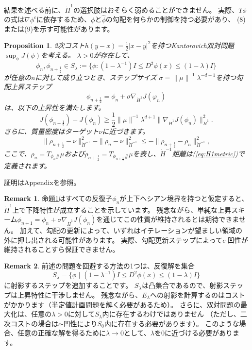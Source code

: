 \documentclass{jsarticle}
\newtheorem{prop}[thm]{Proposition}
\theoremstyle{definition}
\newtheorem{rem}{Remark}[section]
\begin{document}
結果を述べる前に、$\dot{H}^1$の選択肢はおそらく弱めることができません。
実際、$T\phi$の式は$\nabla\phi^c$に依存するため、$\phi$と$\hat{\phi}$の勾配を何らかの制御を持つ必要があり、
(8)または(9)を示す可能性があります。\\


\begin{prop}
  \label{prop:勾配上昇保持}
  2次コスト$h(y-x)=\frac{1}{2}|x-y|^2$を持つKantorovich双対問題$\sup_{\phi}J(\phi)$を考える。
  $\lambda>0$が存在して、
  $$
  \phi_n, \phi_{n + \frac{1}{2}} \in S_{\lambda}:=\{\phi:(1-\lambda^{-1})I \leq D^2\phi(x) \leq (1-\lambda)I\}
  $$
  が任意の$n$に対して成り立つとき、ステップサイズ
  $\sigma = \|\mu\|^{-1}\lambda^{-d+1}$を持つ勾配上昇ステップ
  $$
  \phi_{n+\frac{1}{2}} = \phi_n + \sigma \nabla_{\dot{H}^1} J(\varphi_n)
  $$
  は、以下の上昇性を満たします。
  $$
  J(\phi_{n + \frac{1}{2}})-J(\phi_n) \geq \frac{1}{2}{\|\mu\|^{-1}\lambda^{d+1}}\|\nabla_{\dot{H}^1} J(\phi_n)\|_{\dot{H}^1}^2.
  $$
  さらに、質量密度はターゲット$\nu$に近づきます。
  $$
  \|\rho_{n + \frac{1}{2}} - \nu\|_{\dot{H}^{-1}}^2 - \|\rho_n - \nu\|_{\dot{H}^{-1}}^2 \leq -\|\rho_{n + \frac{1}{2}} - \rho_n\|_{\dot{H}^{-1}}^2,
  $$
  ここで、$\rho_n = T_{\phi_n \#}\mu$および$\rho_{n+\frac{1}{2}} = T_{\phi_{n+\frac{1}{2}} \#}\mu$を表し、$\dot{H}^{-1}$距離は(\ref{eq:H1metric})で定義されます。

\end{prop}


証明はAppendixを参照。

\begin{rem}
  命題\ref{prop:勾配上昇保持}はすべての反復子$\phi_n$が上下ヘシアン境界を持つと仮定すると、$\dot{H}^1$上で下降特性が成立することを示しています。
  残念ながら、単純な上昇スキーム$\phi_{n+1} = \phi_n + \sigma \nabla_{\dot{H}^1} J (\phi_n)$を通じてこの性質が維持されるとは期待できません。
  加えて、勾配の更新によって、いずれはイテレーションが望ましい領域の外に押し出される可能性があります。
  実際、勾配更新ステップによって$c$-凹性が維持されることすら保証できません。
\end{rem}


\begin{rem}
  前述の問題を回避する方法の1つは、反復解を集合
  $$
  S_{\lambda} = \{\phi \,\, | \,\, (1-\lambda^{-1})I \leq D^2\phi(x) \leq (1-\lambda)I \}
  $$
  に射影するステップを追加することです。
  $S_{\lambda}$は凸集合であるので、射影ステップは上昇特性に干渉しません。
  残念ながら、$E_\lambda$への射影を計算するのはコストがかかります（半定値計画問題を解く必要があるため）。
  さらに、双対問題の最大化は、任意の$\lambda > 0$に対して$S_\lambda$内に存在するわけではありません
  （ただし、二次コストの場合は$c$-凹性により$S_0$内に存在する必要があります）。
  このような場合、任意の正確な解を得るために$\lambda \to 0$として、$\lambda$を$0$に近づける必要があります。
\end{rem}
\end{document}
